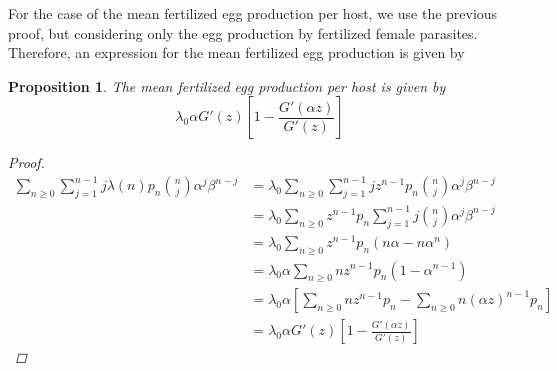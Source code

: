 \documentclass[12pt,a4paper]{article}
\theoremstyle{plain}%
\newtheorem{prop}[thm]{Proposition}
\theoremstyle{definition}
\theoremstyle{remark}
\begin{document}
	For the case of the mean fertilized egg production per host, we use the previous proof, but considering only the egg production by fertilized female parasites. Therefore, an expression for the mean fertilized egg production is given by	
	\begin{prop}\label{prodhuevosfecun}
		The mean fertilized egg production per host is given by
		\begin{equation*}
		\lambda_0\alpha G'(z)\left[1-\frac{G'(\alpha z)}{G'(z)} \right]
		\end{equation*}
		\begin{proof}
			\begin{equation*}
			\begin{split}
			\sum_{n\geq 0}\sum_{j=1}^{n-1}j\lambda(n)p_n\binom{n}{j}\alpha^j\beta^{n-j}
			&=\lambda_0\sum_{n\geq 0}\sum_{j=1}^{n-1}jz^{n-1}p_n\binom{n}{j}\alpha^j\beta^{n-j}\\
			&=\lambda_0\sum_{n\geq 0}z^{n-1}p_n\sum_{j=1}^{n-1} j\binom{n}{j}\alpha^j\beta^{n-j}\\
			&=\lambda_0\sum_{n\geq 0}z^{n-1}p_n(n\alpha-n\alpha^n)\\
			&=\lambda_0\alpha\sum_{n\geq 0}nz^{n-1}p_n(1-\alpha^{n-1})\\
			&=\lambda_0\alpha \left[ \sum_{n\geq 0}nz^{n-1}p_n-\sum_{n\geq 0}n(\alpha z)^{n-1}p_n\right] \\
			&=\lambda_0\alpha G'(z)\left[1-\frac{G'(\alpha z)}{G'(z)} \right] 
			\end{split}
			\end{equation*}
		\end{proof}
	\end{prop}
	
\end{document}
